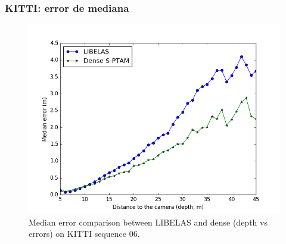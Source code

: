 \documentclass[compress]{beamer}
\begin{document}
%	

\begin{frame}
	\frametitle{KITTI: error de mediana}
	\begin{figure}[!htb]
		\centering
		\includegraphics[width=0.8\columnwidth]{images/medians_comparison_kitti}
		\caption{Median error comparison between LIBELAS and dense (depth vs errors) on KITTI sequence 06.}
		\label{fig:median_comparison_kitti}
	\end{figure}
\end{frame}

\end{document}

